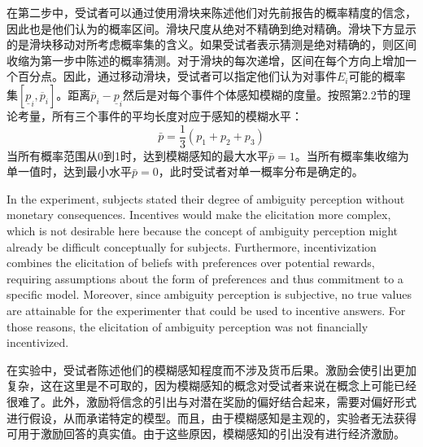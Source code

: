 \documentclass[12pt,a4paper]{article}
\newenvironment{original}
  {\par\medskip\noindent\color{black}\ignorespaces}
  {\par\medskip}
\newenvironment{translation}
  {\par\noindent\color{transblue}\ignorespaces}
  {\par\medskip\medskip}
\begin{document}
\begin{translation}
在第二步中，受试者可以通过使用滑块来陈述他们对先前报告的概率精度的信念，因此也是他们认为的概率区间。滑块尺度从绝对不精确到绝对精确。滑块下方显示的是滑块移动对所考虑概率集的含义。如果受试者表示猜测是绝对精确的，则区间收缩为第一步中陈述的概率猜测。对于滑块的每次递增，区间在每个方向上增加一个百分点。因此，通过移动滑块，受试者可以指定他们认为对事件$E_i$可能的概率集$[\underline{p}_i, \overline{p}_i]$。距离$\overline{p}_i - \underline{p}_i$然后是对每个事件个体感知模糊的度量。按照第2.2节的理论考量，所有三个事件的平均长度对应于感知的模糊水平：
\begin{equation}
\bar{p} = \frac{1}{3} (p_1 + p_2 + p_3)
\end{equation}
当所有概率范围从0到1时，达到模糊感知的最大水平$\bar{p} = 1$。当所有概率集收缩为单一值时，达到最小水平$\bar{p} = 0$，此时受试者对单一概率分布是确定的。
\end{translation}

\begin{original}
In the experiment, subjects stated their degree of ambiguity perception without monetary consequences. Incentives would make the elicitation more complex, which is not desirable here because the concept of ambiguity perception might already be difficult conceptually for subjects. Furthermore, incentivization combines the elicitation of beliefs with preferences over potential rewards, requiring assumptions about the form of preferences and thus commitment to a specific model. Moreover, since ambiguity perception is subjective, no true values are attainable for the experimenter that could be used to incentive answers. For those reasons, the elicitation of ambiguity perception was not financially incentivized.
\end{original}

\begin{translation}
在实验中，受试者陈述他们的模糊感知程度而不涉及货币后果。激励会使引出更加复杂，这在这里是不可取的，因为模糊感知的概念对受试者来说在概念上可能已经很难了。此外，激励将信念的引出与对潜在奖励的偏好结合起来，需要对偏好形式进行假设，从而承诺特定的模型。而且，由于模糊感知是主观的，实验者无法获得可用于激励回答的真实值。由于这些原因，模糊感知的引出没有进行经济激励。
\end{translation}
\end{document}
